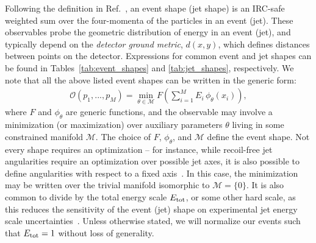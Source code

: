 \documentclass[letterpaper,11pt]{article}
\newcommand{\M}{\mathcal{M}}
\DeclareRobustCommand{\Tabs}[2]{Tables~\ref{tab:#1} and \ref{tab:#2}}
\DeclareRobustCommand{\Refer}[1]{Ref.~\cite{#1}}
\begin{document}
Following the definition in \Refer{Ellis_2010}, an event shape (jet shape) is an IRC-safe weighted sum over the four-momenta of the particles in an event (jet).
%
These observables probe the geometric distribution of energy in an event (jet), and typically depend on the \emph{detector ground metric}, $d(x,y)$, which defines distances between points on the detector.
%
Expressions for common event and jet shapes can be found in \Tabs{event_shapes}{jet_shapes}, respectively.
%
We note that all the above listed event shapes can be written in the generic form:
%
\begin{align}
    \mathcal{O}(p_1,...,p_M) = \min_{\theta \in \M}F\left(\sum_{i=1}^M E_i \, \phi_\theta(x_i) \right), \label{eq:eventshape}
\end{align}
%
where $F$ and $\phi_\theta$ are generic functions, and the observable may involve a minimization (or maximization) over auxiliary parameters $\theta$ living in some constrained manifold $\M$. The choice of $F$, $\phi_\theta$, and $\M$ define the event shape.
%
Not every shape requires an optimization -- for instance, while recoil-free jet angularities require an optimization over possible jet axes, it is also possible to define angularities with respect to a fixed axis~\cite{2020}.
%
In this case, the minimization may be written over the trivial manifold isomorphic to $\M = \{0\}$.
%
It is also common to divide by the total energy scale $E_{\rm tot}$, or some other hard scale, as this reduces the sensitivity of the event (jet) shape on experimental jet energy scale uncertainties~\cite{Banfi:2010xy}. %
Unless otherwise stated, we will normalize our events such that $E_{\rm tot} = 1$ without loss of generality. 
\end{document}
